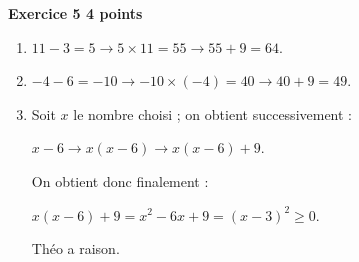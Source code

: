 \textbf{Exercice 5 \hfill 4 points}

\medskip 

%

\begin{enumerate}
\item %
$11 - 3 = 5 \to 5 \times 11 = 55 \to 55 + 9 = 64$. 
\item %
$- 4 - 6 = - 10\to - 10 \times (- 4) = 40 \to 40 + 9 = 49$. 
\item %
Soit $x$ le nombre choisi ; on obtient successivement :

$x - 6 \to  x(x - 6)  \to  x(x - 6) + 9$.

On obtient donc finalement :

$x(x - 6) + 9 = x^2 - 6x + 9 = (x - 3)^2 \geqslant 0$.

Théo a raison. 
\end{enumerate}

\vspace{0.5cm}

